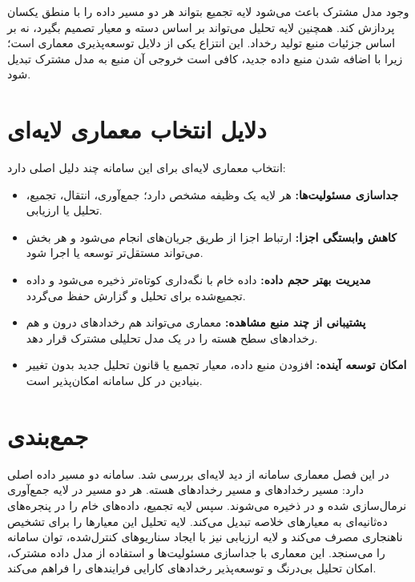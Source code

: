 وجود مدل مشترک باعث می‌شود لایه تجمیع بتواند هر دو مسیر داده را با منطق یکسان پردازش کند. همچنین لایه تحلیل می‌تواند بر اساس دسته و معیار تصمیم بگیرد، نه بر اساس جزئیات منبع تولید رخداد. این انتزاع یکی از دلایل توسعه‌پذیری معماری است؛ زیرا با اضافه شدن منبع داده جدید، کافی است خروجی آن منبع به مدل مشترک تبدیل شود.

\section{دلایل انتخاب معماری لایه‌ای}
انتخاب معماری لایه‌ای برای این سامانه چند دلیل اصلی دارد:
\begin{itemize}
\item \textbf{جداسازی مسئولیت‌ها:} هر لایه یک وظیفه مشخص دارد؛ جمع‌آوری، انتقال، تجمیع، تحلیل یا ارزیابی.
\item \textbf{کاهش وابستگی اجزا:} ارتباط اجزا از طریق جریان‌های  انجام می‌شود و هر بخش می‌تواند مستقل‌تر توسعه یا اجرا شود.
\item \textbf{مدیریت بهتر حجم داده:} داده خام با نگه‌داری کوتاه‌تر ذخیره می‌شود و داده تجمیع‌شده برای تحلیل و گزارش حفظ می‌گردد.
\item \textbf{پشتیبانی از چند منبع مشاهده:} معماری می‌تواند هم رخدادهای درون  و هم رخدادهای سطح هسته را در یک مدل تحلیلی مشترک قرار دهد.
\item \textbf{امکان توسعه آینده:} افزودن منبع داده، معیار تجمیع یا قانون تحلیل جدید بدون تغییر بنیادین در کل سامانه امکان‌پذیر است.
\end{itemize}

\section{جمع‌بندی}
در این فصل معماری سامانه از دید لایه‌ای بررسی شد. سامانه دو مسیر داده اصلی دارد: مسیر رخدادهای  و مسیر رخدادهای هسته. هر دو مسیر در لایه جمع‌آوری نرمال‌سازی شده و در  ذخیره می‌شوند. سپس لایه تجمیع، داده‌های خام را در پنجره‌های ده‌ثانیه‌ای به معیارهای خلاصه تبدیل می‌کند. لایه تحلیل این معیارها را برای تشخیص ناهنجاری مصرف می‌کند و لایه ارزیابی نیز با ایجاد سناریوهای کنترل‌شده، توان سامانه را می‌سنجد. این معماری با جداسازی مسئولیت‌ها و استفاده از مدل داده مشترک، امکان تحلیل بی‌درنگ و توسعه‌پذیر رخدادهای کارایی فرایندهای  را فراهم می‌کند.
